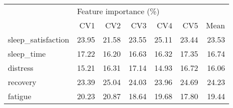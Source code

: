 \begin{tabular}{lrrrrrr}
\toprule
{} & \multicolumn{6}{l}{Feature importance (\%)} \\
{} &                    CV1 &    CV2 &    CV3 &    CV4 &    CV5 &   Mean \\
\midrule
sleep\_satisfaction &                  23.95 &  21.58 &  23.55 &  25.11 &  23.44 &  23.53 \\
sleep\_time         &                  17.22 &  16.20 &  16.63 &  16.32 &  17.35 &  16.74 \\
distress           &                  15.21 &  16.31 &  17.14 &  14.93 &  16.72 &  16.06 \\
recovery           &                  23.39 &  25.04 &  24.03 &  23.96 &  24.69 &  24.23 \\
fatigue            &                  20.23 &  20.87 &  18.64 &  19.68 &  17.80 &  19.44 \\
\bottomrule
\end{tabular}

